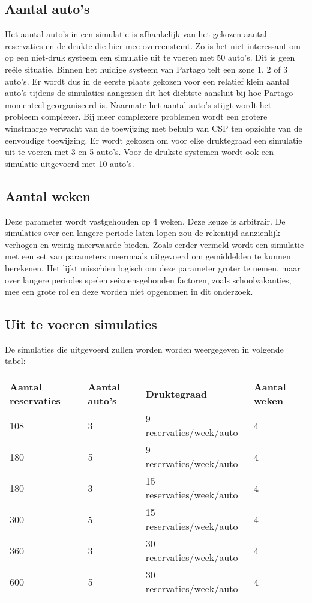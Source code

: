 \subsection{Aantal auto's}
Het aantal auto's in een simulatie is afhankelijk van het gekozen aantal reservaties en de drukte die hier mee overeenstemt. Zo is het niet interessant om op een niet-druk systeem een simulatie uit te voeren met 50 auto's. Dit is geen reële situatie. Binnen het huidige systeem van Partago telt een zone 1, 2 of 3 auto's. Er wordt dus in de eerste plaats gekozen voor een relatief klein aantal auto's tijdens de simulaties aangezien dit het dichtste aansluit bij hoe Partago momenteel georganiseerd is. Naarmate het aantal auto's stijgt wordt het probleem complexer. Bij meer complexere problemen wordt een grotere winstmarge verwacht van de toewijzing met behulp van CSP ten opzichte van de eenvoudige toewijzing. Er wordt gekozen om voor elke druktegraad een simulatie uit te voeren met 3 en 5 auto's. Voor de drukste systemen wordt ook een simulatie uitgevoerd met 10 auto's.
\subsection{Aantal weken}
Deze parameter wordt vastgehouden op 4 weken. Deze keuze is arbitrair. De simulaties over een langere periode laten lopen zou de rekentijd aanzienlijk verhogen en weinig meerwaarde bieden. Zoals eerder vermeld wordt een simulatie met een set van parameters meermaals uitgevoerd om gemiddelden te kunnen berekenen. Het lijkt misschien logisch om deze parameter groter te nemen, maar over langere periodes spelen seizoensgebonden factoren, zoals schoolvakanties, mee een grote rol en deze worden niet opgenomen in dit onderzoek.
\subsection{Uit te voeren simulaties}
De simulaties die uitgevoerd zullen worden worden weergegeven in volgende tabel:
\begin{center}
	\label{tab:parameters}
	\begin{tabular}{ | l | l | l | p{3cm} |}
		\hline
		Aantal reservaties & Aantal auto's & Druktegraad & Aantal weken \\ \hline
		108 & 3 & 9 reservaties/week/auto & 4 \\ \hline
		180 & 5 & 9 reservaties/week/auto & 4 \\ \hline
		180 & 3 & 15 reservaties/week/auto & 4 \\ \hline
		300 & 5 & 15 reservaties/week/auto & 4 \\ \hline
		360 & 3 & 30 reservaties/week/auto & 4 \\ \hline
		600 & 5 & 30 reservaties/week/auto & 4 \\ \hline
	\end{tabular}
\end{center} 

